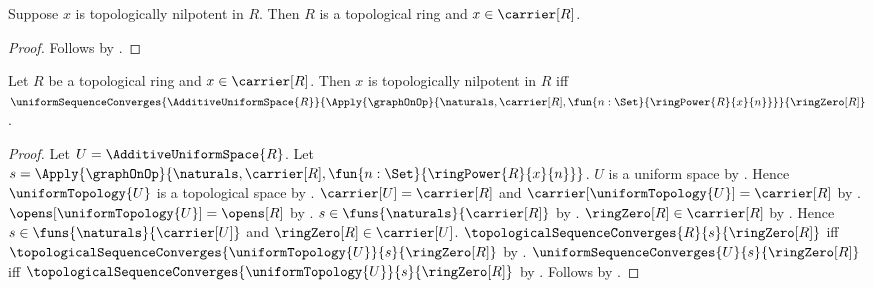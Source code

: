 \begin{proposition}\label{topologically_nilpotent_element_ambient}
    Suppose $x$ is topologically nilpotent in $R$.
    Then $R$ is a topological ring and $x\in\carrier[R]$.
\end{proposition}
\begin{proof}
    Follows by .
\end{proof}

\begin{theorem}\label{topologically_nilpotent_iff_additive_uniform_convergence}
    Let $R$ be a topological ring and $x\in\carrier[R]$.
    Then $x$ is topologically nilpotent in $R$ iff
        $\uniformSequenceConverges{\AdditiveUniformSpace{R}}{
            \Apply{\graphOnOp}{
                \naturals,\carrier[R],
                \fun{n:\Set}{\ringPower{R}{x}{n}}}}{
            \ringZero[R]}$.
\end{theorem}
\begin{proof}
    Let $U=\AdditiveUniformSpace{R}$.
    Let $s=\Apply{\graphOnOp}{
        \naturals,\carrier[R],
        \fun{n:\Set}{\ringPower{R}{x}{n}}}$.
    $U$ is a uniform space by
        .
    Hence $\uniformTopology{U}$ is a topological space by
        .
    $\carrier[U]=\carrier[R]$ and
        $\carrier[\uniformTopology{U}]=\carrier[R]$ by
        .
    $\opens[\uniformTopology{U}]=\opens[R]$ by
        .
    $s\in\funs{\naturals}{\carrier[R]}$ by
        .
    $\ringZero[R]\in\carrier[R]$ by
        .
    Hence $s\in\funs{\naturals}{\carrier[U]}$ and
        $\ringZero[R]\in\carrier[U]$.
    $\topologicalSequenceConverges{R}{s}{\ringZero[R]}$ iff
        $\topologicalSequenceConverges{\uniformTopology{U}}{s}{
            \ringZero[R]}$ by
        .
    $\uniformSequenceConverges{U}{s}{\ringZero[R]}$ iff
        $\topologicalSequenceConverges{\uniformTopology{U}}{s}{
            \ringZero[R]}$ by
        .
    Follows by .
\end{proof}

